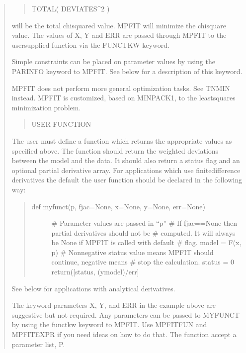 \documentclass[letterpaper,10pt,english]{sphinxmanual}
\begin{document}
\begin{quote}
\begin{quote}
TOTAL( DEVIATES\textasciicircum{}2 )
\end{quote}

will be the total chi\sphinxhyphen{}squared value.  MPFIT will minimize the
chi\sphinxhyphen{}square value.  The values of X, Y and ERR are passed through
MPFIT to the user\sphinxhyphen{}supplied function via the FUNCTKW keyword.

Simple constraints can be placed on parameter values by using the
PARINFO keyword to MPFIT.  See below for a description of this
keyword.

MPFIT does not perform more general optimization tasks.  See TNMIN
instead.  MPFIT is customized, based on MINPACK\sphinxhyphen{}1, to the
least\sphinxhyphen{}squares minimization problem.
\begin{quote}

USER FUNCTION
\end{quote}

The user must define a function which returns the appropriate
values as specified above.  The function should return the weighted
deviations between the model and the data.  It should also return a status
flag and an optional partial derivative array.  For applications which
use finite\sphinxhyphen{}difference derivatives \textendash{} the default \textendash{} the user
function should be declared in the following way:
\begin{quote}
\begin{description}
\item[{def myfunct(p, fjac=None, x=None, y=None, err=None)}] \leavevmode
\# Parameter values are passed in “p”
\# If fjac==None then partial derivatives should not be
\# computed.  It will always be None if MPFIT is called with default
\# flag.
model = F(x, p)
\# Non\sphinxhyphen{}negative status value means MPFIT should continue, negative means
\# stop the calculation.
status = 0
return({[}status, (y\sphinxhyphen{}model)/err{]}

\end{description}
\end{quote}

See below for applications with analytical derivatives.

The keyword parameters X, Y, and ERR in the example above are
suggestive but not required.  Any parameters can be passed to
MYFUNCT by using the functkw keyword to MPFIT.  Use MPFITFUN and
MPFITEXPR if you need ideas on how to do that.  The function 
accept a parameter list, P.


\end{quote}
\end{document}
